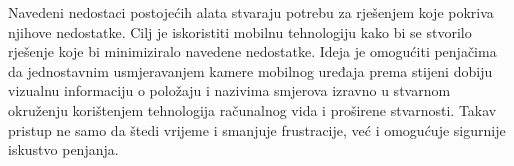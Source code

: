 Navedeni nedostaci postojećih alata stvaraju potrebu za rješenjem koje pokriva njihove nedostatke. Cilj je iskoristiti mobilnu tehnologiju kako bi se stvorilo rješenje koje bi minimiziralo navedene nedostatke. Ideja je omogućiti penjačima da jednostavnim usmjeravanjem kamere mobilnog uređaja prema stijeni dobiju vizualnu informaciju o položaju i nazivima smjerova izravno u stvarnom okruženju korištenjem tehnologija računalnog vida i proširene stvarnosti. Takav pristup ne samo da štedi vrijeme i smanjuje frustracije, već i omogućuje sigurnije iskustvo penjanja. 